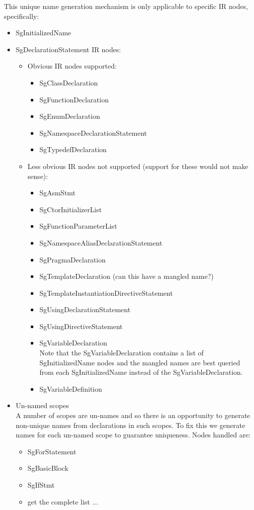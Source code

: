 This unique name generation mechanism is only applicable to specific IR nodes, specifically:
\begin{itemize}
   \item SgInitializedName
   \item SgDeclarationStatement IR nodes:
   \begin{itemize}
      \item Obvious IR nodes supported:
      \begin{itemize}
         \item SgClassDeclaration
         \item SgFunctionDeclaration
         \item SgEnumDeclaration
         \item SgNamespaceDeclarationStatement
         \item SgTypedefDeclaration
      \end{itemize}
      \item Less obvious IR nodes not supported (support for these would not make sense):
      \begin{itemize}
         \item SgAsmStmt
         \item SgCtorInitializerList
         \item SgFunctionParameterList
         \item SgNamespaceAliasDeclarationStatement
         \item SgPragmaDeclaration
         \item SgTemplateDeclaration (can this have a mangled name?)
         \item SgTemplateInstantiationDirectiveStatement
         \item SgUsingDeclarationStatement
         \item SgUsingDirectiveStatement
         \item SgVariableDeclaration \\
               Note that the SgVariableDeclaration contains a list of SgInitializedName
               nodes and the mangled names are best queried from each SgInitializedName 
               instead of the SgVariableDeclaration.
         \item SgVariableDefinition
      \end{itemize}
   \end{itemize}
   \item Un-named scopes \\
         A number of scopes are un-names and so there is an opportunity to generate
    non-unique names from declarations in such scopes.  To fix this we generate names for
    each un-named scope to guarantee uniqueness.  Nodes handled are:
   \begin{itemize}
      \item SgForStatement 
      \item SgBasicBlock
      \item SgIfStmt
      \item get the complete list ...
   \end{itemize}
\end{itemize}
